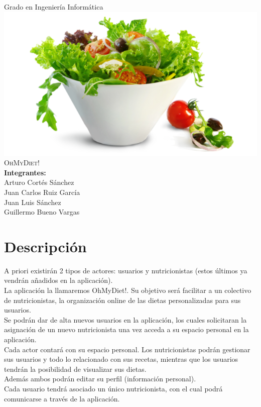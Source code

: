 \documentclass[12pt,letterpaper]{article}
\author{Guillermo Bueno}
\begin{document}
\begin{titlepage}
 
\begin{center}

{\Large {Grado en Ingeniería Informática} }
\\[2cm] 
\includegraphics[scale=0.9]{logo.png}
\\[2cm]

{\Huge \textsc{OhMyDiet!}}\\[3cm]


\textbf{\textsf{Integrantes:}}\\
\linespread{1}
\large Arturo Cortés Sánchez\\Juan Carlos Ruiz García\\Juan Luis Sánchez\\ Guillermo Bueno Vargas


 
\end{center}
 
\end{titlepage}

\tableofcontents

\newpage

\section{Descripción}
{\setlength{\parindent}{0cm}

A priori existirán 2 tipos de actores: usuarios y nutricionistas (estos últimos ya vendrán añadidos en la aplicación).
\\[0.7cm]
La aplicación la llamaremos OhMyDiet!. Su objetivo será facilitar a un colectivo de nutricionistas, la organización online de las dietas personalizadas para sus usuarios.
\\[0.7cm]
Se podrán dar de alta nuevos usuarios en la aplicación, los cuales solicitaran la asignación de un nuevo nutricionista una vez acceda a su espacio personal en la aplicación.
\\[0.7cm]
Cada actor contará con su espacio personal. Los nutricionistas podrán gestionar sus usuarios y todo lo relacionado con sus recetas, mientras que los usuarios tendrán la posibilidad de visualizar sus dietas. 
\\[0.7cm]
Además ambos podrán editar su perfil (información personal).
\\[0.7cm]
Cada usuario tendrá asociado un único nutricionista, con el cual podrá comunicarse a través de la aplicación.

}
\end{document}
